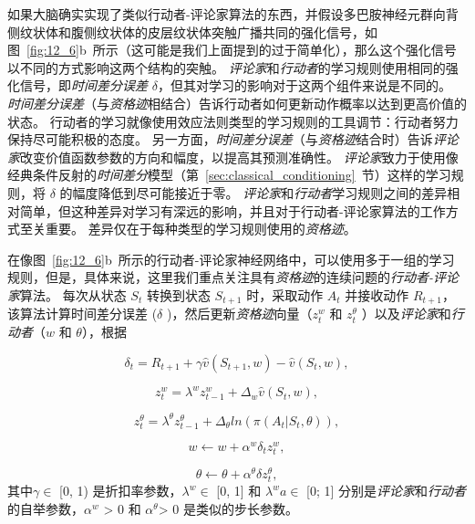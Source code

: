 如果大脑确实实现了类似行动者-评论家算法的东西，并假设多巴胺神经元群向背侧纹状体和腹侧纹状体的皮层纹状体突触广播共同的强化信号，如图~\ref{fig:12_6}b~所示（这可能是我们上面提到的过于简单化），那么这个强化信号以不同的方式影响这两个结构的突触。
\textit{评论家}和\textit{行动者}的学习规则使用相同的强化信号，即\textit{时间差分误差} $\delta$，但其对学习的影响对于这两个组件来说是不同的。
\textit{时间差分误差}（与\textit{资格迹}相结合）告诉行动者如何更新动作概率以达到更高价值的状态。
行动者的学习就像使用效应法则类型的学习规则的工具调节：行动者努力保持尽可能积极的态度。
另一方面，\textit{时间差分误差}（与\textit{资格迹}结合时）告诉\textit{评论家}改变价值函数参数的方向和幅度，以提高其预测准确性。
\textit{评论家}致力于使用像经典条件反射的\textit{时间差分}模型（第~\ref{sec:classical_conditioning}~节）这样的学习规则，将 $\delta$ 的幅度降低到尽可能接近于零。
\textit{评论家}和\textit{行动者}学习规则之间的差异相对简单，但这种差异对学习有深远的影响，并且对于行动者-评论家算法的工作方式至关重要。
差异仅在于每种类型的学习规则使用的\textit{资格迹}。


在像图~\ref{fig:12_6}b~所示的行动者-评论家神经网络中，可以使用多于一组的学习规则，但是，具体来说，这里我们重点关注具有\textit{资格迹}的连续问题的\textit{行动者-评论家}算法。
每次从状态 $S_t$ 转换到状态 $S_{t+1}$ 时，采取动作 $A_t$ 并接收动作 $R_{t+1}$，该算法计算时间差分误差 ($\delta$ )，然后更新\textit{资格迹}向量（$z_t^w$ 和 $z_t^{\theta}$ ）以及\textit{评论家}和\textit{行动者}（$w$ 和 $\theta$），根据

\begin{equation}
	\delta_t = R_{t+1}
		+ \gamma \hat{v} (S_{t+1}, w)
		- \hat{v} (S_t, w),
\end{equation}


\begin{equation}
	z_t ^w = \lambda^w z_{t-1}^w
		+ \Delta_w \hat{v} (S_t, w),
\end{equation}

\begin{equation}
	z_t^{\theta} = \lambda^{\theta} z_{t-1}^{\theta}
		+ \Delta_{\theta} ln(\pi(A_t | S_t, \theta)),
\end{equation}


\begin{equation}
	w \longleftarrow w + \alpha^w \delta_t z_t^w,
\end{equation}

\begin{equation}
	\theta \longleftarrow \theta + \alpha^{\theta} \delta z_t^{\theta},
\end{equation}
其中$\gamma \in $ [0, 1) 是折扣率参数，$\lambda^w \in$ [0, 1] 和 $\lambda ^w a \in$ [0; 1] 分别是\textit{评论家}和\textit{行动者}的自举参数，$\alpha ^w$ > 0 和 $\alpha ^{\theta}$> 0 是类似的步长参数。


